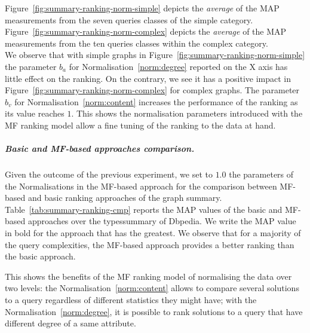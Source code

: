 Figure~\ref{fig:summary-ranking-norm-simple} depicts the \emph{average} of the MAP measurements from the seven queries classes of the simple category. Figure~\ref{fig:summary-ranking-norm-complex} depicts the \emph{average} of the MAP measurements from the ten queries classes within the complex category.\\

We observe that with simple graphs in Figure~\ref{fig:summary-ranking-norm-simple} the parameter $b_a$ for Normalisation~\ref{norm:degree} reported on the X axis has little effect on the ranking. On the contrary, we see it has a positive impact in Figure~\ref{fig:summary-ranking-norm-complex} for complex graphs.
The parameter $b_v$ for Normalisation~\ref{norm:content} increases the performance of the ranking as its value reaches $1$.
This shows the normalisation parameters introduced with the \gls{MF} ranking model allow a fine tuning of the ranking to the data at hand.



\subparagraph{Basic and MF-based approaches comparison.}

Given the outcome of the previous experiment, we set to $1.0$ the parameters of the Normalisations in the \gls{MF}-based approach for the comparison between \gls{MF}-based and basic ranking approaches of the graph summary.\\

Table~\ref{tab:summary-ranking-cmp} reports the MAP values of the basic and \gls{MF}-based approaches over the \gls{typessummary} of Dbpedia. We write the MAP value in bold for the approach that has the greatest. We observe that for a majority of the query complexities, the \gls{MF}-based approach provides a better ranking than the basic approach.

This shows the benefits of the \gls{MF} ranking model of normalising the data over two levels: the Normalisation~\ref{norm:content} allows to compare several solutions to a query regardless of different statistics they might have; with the Normalisation~\ref{norm:degree}, it is possible to rank solutions to a query that have different degree of a same attribute.




